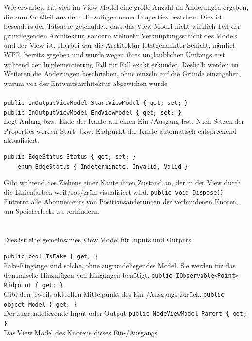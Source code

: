 Wie erwartet, hat sich im View Model eine große Anzahl an Änderungen ergeben, die zum Großteil aus dem Hinzufügen neuer Properties bestehen. Dies ist besonders der Tatsache geschuldet, dass das View Model nicht wirklich Teil der grundlegenden Architektur, sondern vielmehr Verknüpfungsschicht des Models und der View ist. Hierbei war die Architektur letztgenannter Schicht, nämlich WPF, bereits gegeben und  wurde wegen ihres unglaublichen Umfangs erst während der Implementierung Fall für Fall exakt erkundet. Deshalb werden im Weiteren die Änderungen beschrieben, ohne einzeln auf die Gründe einzugehen, warum von der Entwurfsarchitektur abgewichen wurde.

\paragraph{}
\begin{itemize}
	\add \verb!public InOutputViewModel StartViewModel { get; set; }! \\
	     \verb!public InOutputViewModel EndViewModel { get; set; }! \\
	Legt Anfang bzw. Ende der Kante auf einen Ein-/Ausgang fest. Nach Setzen der Properties werden Start- bzw. Endpunkt der Kante automatisch entsprechend aktualisiert.
	\add \begin{verbatim}public EdgeStatus Status { get; set; }
	enum EdgeStatus { Indeterminate, Invalid, Valid }
	\end{verbatim}
	Gibt während des Ziehens einer Kante ihren Zustand an, der in der View durch die Linienfarben weiß/rot/grün visualisiert wird.
	\add \verb!public void Dispose()! \\
	Entfernt alle Abonnements von Positionsänderungen der verbundenen Knoten, um Speicherlecks zu verhindern.
\end{itemize}

\paragraph{}~\\
Dies ist eine gemeinsames View Model für Inputs und Outputs.
\begin{itemize}
	\add \verb!public bool IsFake { get; }! \\
	Fake-Eingänge sind solche, ohne zugrundeliegendes Model. Sie werden für das dynamische Hinzufügen von Eingängen benötigt.
	\add \verb!public IObservable<Point> Midpoint { get; }! \\
	Gibt den jeweils aktuellen Mittelpunkt des Ein-/Ausgangs zurück.
	\add \verb!public object Model { get; }! \\
	Der zugrundeliegende Input oder Output
	\add \verb!public NodeViewModel Parent { get; }! \\
	Das View Model des Knotens dieses Ein-/Ausgangs
\end{itemize}

